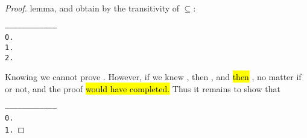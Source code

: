 \begin{proof}
lemma, and obtain  by the transitivity of $\subseteq$:
\begin{alltt}
   ------------------------------------
    0.  
    1.  
    2.  
\end{alltt}
Knowing  we cannot prove . However, if we knew , then , and \hl{then}
, no matter if  or not, and the proof
\hl{would have completed.} Thus it remains to show that
\begin{alltt}
   ------------------------------------
    0.  
    1.  

\end{alltt}
\end{proof}
